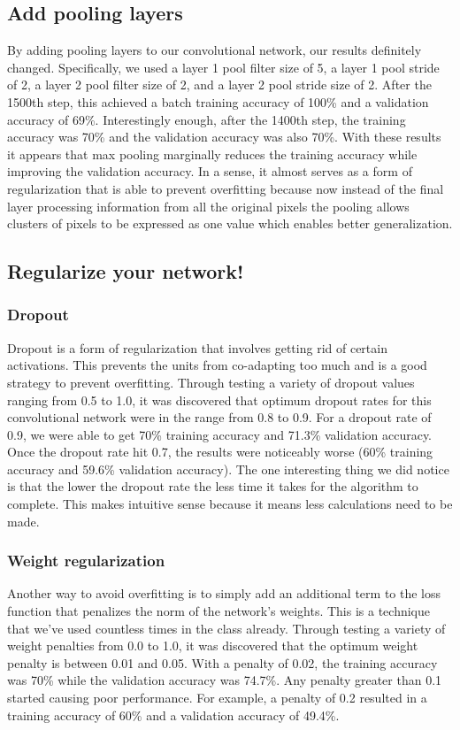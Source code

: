\documentclass{article}
\begin{document}
\subsection{Add pooling layers}
By adding pooling layers to our convolutional network, our results definitely changed. Specifically, we used a layer 1 pool filter size of 5, a layer 1 pool stride of 2, a layer 2 pool filter size of 2, and a layer 2 pool stride size of 2. After the 1500th step, this achieved a batch training accuracy of 100\% and a validation accuracy of 69\%. Interestingly enough, after the 1400th step, the training accuracy was 70\% and the validation accuracy was also 70\%. With these results it appears that max pooling marginally reduces the training accuracy while improving the validation accuracy. In a sense, it almost serves as a form of regularization that is able to prevent overfitting because now instead of the final layer processing information from all the original pixels the pooling allows clusters of pixels to be expressed as one value which enables better generalization.

\subsection{Regularize your network!}
\subsubsection{Dropout}
Dropout is a form of regularization that involves getting rid of certain activations. This prevents the units from co-adapting too much and is a good strategy to prevent overfitting. Through testing a variety of dropout values ranging from 0.5 to 1.0, it was discovered that optimum dropout rates for this convolutional network were in the range from 0.8 to 0.9. For a dropout rate of 0.9, we were able to get 70\% training accuracy and 71.3\% validation accuracy. Once the dropout rate hit 0.7, the results were noticeably worse (60\% training accuracy and 59.6\% validation accuracy). The one interesting thing we did notice is that the lower the dropout rate the less time it takes for the algorithm to complete. This makes intuitive sense because it means less calculations need to be made.

\subsubsection{Weight regularization}
Another way to avoid overfitting is to simply add an additional term to the loss function that penalizes the norm of the network's weights. This is a technique that we've used countless times in the class already. Through testing a variety of weight penalties from 0.0 to 1.0, it was discovered that the optimum weight penalty is between 0.01 and 0.05. With a penalty of 0.02, the training accuracy was 70\% while the validation accuracy was 74.7\%. Any penalty greater than 0.1 started causing poor performance. For example, a penalty of 0.2 resulted in a training accuracy of 60\% and a validation accuracy of 49.4\%. 
\end{document}
